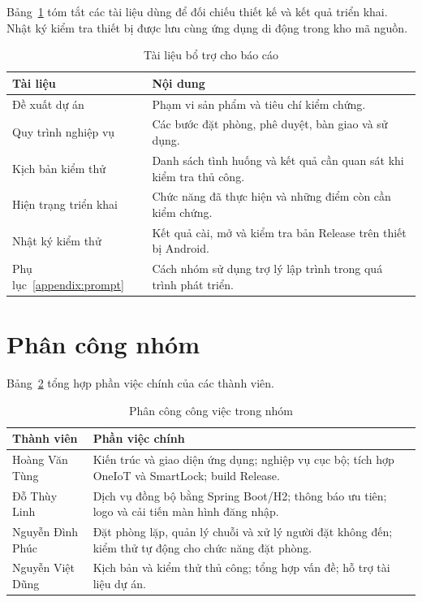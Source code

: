 Bảng~\ref{tab:docs} tóm tắt các tài liệu dùng để đối chiếu thiết kế và kết quả triển khai. Nhật ký kiểm tra thiết bị được lưu cùng ứng dụng di động trong kho mã nguồn.

\begin{table}[H]
\centering
\caption{Tài liệu bổ trợ cho báo cáo}
\label{tab:docs}
\small
\begin{tabularx}{\textwidth}{>{\raggedright\arraybackslash}p{4.6cm} X}
\toprule
\rowcolor{RoomHubLight}
\textbf{Tài liệu} & \textbf{Nội dung} \\
\midrule
Đề xuất dự án & Phạm vi sản phẩm và tiêu chí kiểm chứng. \\
Quy trình nghiệp vụ & Các bước đặt phòng, phê duyệt, bàn giao và sử dụng. \\
Kịch bản kiểm thử & Danh sách tình huống và kết quả cần quan sát khi kiểm tra thủ công. \\
Hiện trạng triển khai & Chức năng đã thực hiện và những điểm còn cần kiểm chứng. \\
Nhật ký kiểm thử & Kết quả cài, mở và kiểm tra bản Release trên thiết bị Android. \\
Phụ lục~\ref{appendix:prompt} & Cách nhóm sử dụng trợ lý lập trình trong quá trình phát triển. \\
\bottomrule
\end{tabularx}
\end{table}

\section{Phân công nhóm}

Bảng~\ref{tab:contrib} tổng hợp phần việc chính của các thành viên.

\begin{table}[H]
\centering
\caption{Phân công công việc trong nhóm}
\label{tab:contrib}
\small
\begin{tabularx}{\textwidth}{>{\raggedright\arraybackslash}p{3.8cm} X}
\toprule
\rowcolor{RoomHubLight}
\textbf{Thành viên} & \textbf{Phần việc chính} \\
\midrule
Hoàng Văn Tùng & Kiến trúc và giao diện ứng dụng; nghiệp vụ cục bộ; tích hợp OneIoT và SmartLock; build Release. \\
Đỗ Thùy Linh & Dịch vụ đồng bộ bằng Spring Boot/H2; thông báo ưu tiên; logo và cải tiến màn hình đăng nhập. \\
Nguyễn Đình Phúc & Đặt phòng lặp, quản lý chuỗi và xử lý người đặt không đến; kiểm thử tự động cho chức năng đặt phòng. \\
Nguyễn Việt Dũng & Kịch bản và kiểm thử thủ công; tổng hợp vấn đề; hỗ trợ tài liệu dự án. \\
\bottomrule
\end{tabularx}
\end{table}
